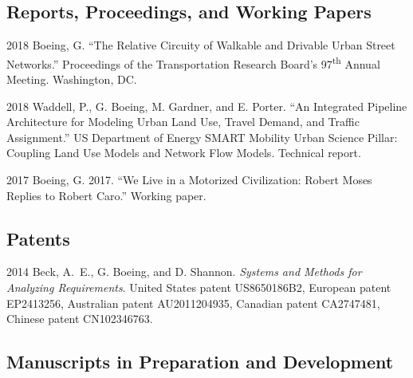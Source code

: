 \documentclass{academiccv}
\begin{document}
\subsection*{Reports, Proceedings, and Working Papers}

\begin{tablist}

\item[2018] \tab Boeing, G. \enquote{The Relative Circuity of Walkable and Drivable Urban Street Networks.} Proceedings of the Transportation Research Board's 97\textsuperscript{th} Annual Meeting. Washington, DC.
	
\item[2018] \tab Waddell, P., G. Boeing, M. Gardner, and E. Porter. \enquote{An Integrated Pipeline Architecture for Modeling Urban Land Use, Travel Demand, and Traffic Assignment.} US Department of Energy SMART Mobility Urban Science Pillar: Coupling Land Use Models and Network Flow Models. Technical report.

\item[2017] \tab Boeing, G. 2017. \enquote{We Live in a Motorized Civilization: Robert Moses Replies to Robert Caro.} Working paper.
	
\end{tablist}



\subsection*{Patents}

\begin{tablist}

\item[2014] \tab Beck, A.~E., G. Boeing, and D. Shannon. \emph{Systems and Methods for Analyzing Requirements}. United States patent US8650186B2, European patent EP2413256, Australian patent AU2011204935, Canadian patent CA2747481, Chinese patent CN102346763.

\end{tablist}



\subsection*{Manuscripts in Preparation and Development}
\end{document}
